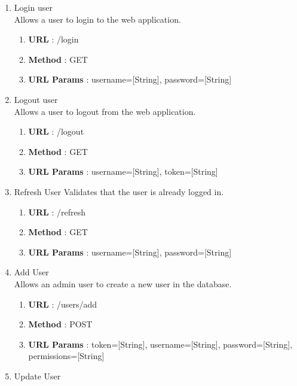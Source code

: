 \documentclass[11pt, titlepage]{article}
\begin{document}
\begin{enumerate}
        \item Login user \\
                Allows a user to login to the web application.
                \begin{enumerate}
                    \item \textbf{URL} : /login
                    \item \textbf{Method} : GET
                    \item \textbf{URL Params} : username=[String], password=[String]
                \end{enumerate}
        \item Logout user \\ 
            Allows a user to logout from the web application.
                \begin{enumerate}
                    \item \textbf{URL} : /logout
                    \item \textbf{Method} : GET
                    \item \textbf{URL Params} : username=[String], token=[String]
                \end{enumerate}
        \item Refresh User
            Validates that the user is already logged in.
                \begin{enumerate}
                    \item \textbf{URL} : /refresh
                    \item \textbf{Method} : GET
                    \item \textbf{URL Params} : username=[String], password=[String]
                \end{enumerate}
        \item Add User \\
             Allows an admin user to create a new user in the database.
                \begin{enumerate}
                    \item \textbf{URL} : /users/add
                    \item \textbf{Method} : POST
                    \item \textbf{URL Params} : token=[String], username=[String], password=[String], permissions=[String]
                \end{enumerate}
        \item Update User \\

\end{enumerate}
\end{document}
